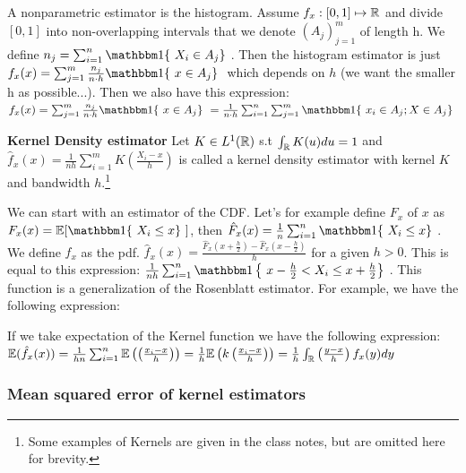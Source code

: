 \documentclass{article}
\begin{document}
A nonparametric estimator is the histogram. Assume \(f_x : [0,1]\mapsto \mathbb{R}\) and divide \([0,1]\) into non-overlapping intervals that we denote \((A_j)_{j=1}^{m}\) of length h. We define \(n_{j}= \sum_{i=1}^{n}\indf \{\ X_i\in A_j \}\ \). Then the histogram estimator is just \(f_{x}(x)=\sum_{j=1}^{m} \frac{n_j}{n\cdot h} \indf \{\ x\in A_j \}\ \) which depends on $h$ (we want the smaller h as possible...). Then we also have this expression: \(f_{x}(x)=\sum_{j=1}^{m} \frac{n_j}{n\cdot h} \indf \{\ x\in A_j \}\ = \frac{1}{n\cdot h}\sum_{i=1}^{n} \sum_{j=1}^{m}  \indf \{\ x_{i} \in A_j ; X \in A_j \}\ \) \\

\begin{definition} \textbf{Kernel Density estimator}
    Let \(K \in L^{1}(\mathbb{R})\) s.t \( \int_{\mathbb{R}}K(u) du=1\) and \(\hat{f}_{x}(x)=\frac{1}{nh}\sum_{i=1}^{m}K \left(\frac{X_{i}-x}{h}\right)\) is called a kernel density estimator with kernel $K$ and bandwidth $h$.\footnote{
        Some examples of Kernels are given in the class notes, but are omitted here for brevity. }
\end{definition}

\begin{example}
    We can start with an estimator of the CDF. Let's for example define \(F_x\) of $x$ as \(F_{x}(x)= \E[\indf \{\ X_i \leq x \}\ ] \), then \( \hat{F}_{x}(x)= \frac{1}{n} \sum_{i=1}^{n}\indf \{\ X_i \leq x \}\ \). We define $f_x$ as the pdf. \(\hat{f}_{x}(x)=\frac{\hat{F}_{x}\left(x+\frac{h}{2}\right)-\hat{F}_{x}\left(x-\frac{h}{2}\right)}{h}\) for a given $h>0$. This is equal to this expression: \(\frac{1}{nh}\sum_{i=1}^{n} \indf \left\{\ x-\frac{h}{2}<X_i \leq x+\frac{h}{2} \right\}\ \). This function is a generalization of the Rosenblatt estimator. For example, we have the following expression: 
\end{example}

\begin{remark}
    If we take expectation of the Kernel function we have the following expression: \(\mathbb{E}(\hat{f}_{x}(x))= \frac{1}{hn}\sum_{i = 1}^n \mathbb{E} \left(\left( \frac{x_i-x}{h}\right)\right)= \frac{1}{h} \mathbb{E} \left(k \left( \frac{x_i-x}{h}\right)\right)  = \frac{1}{h}\int_{\mathbb{R}}\left( \frac{y-x}{h}\right) f_{x}(y) dy\)
\end{remark}

\subsubsection{Mean squared error of kernel estimators}
\end{document}
